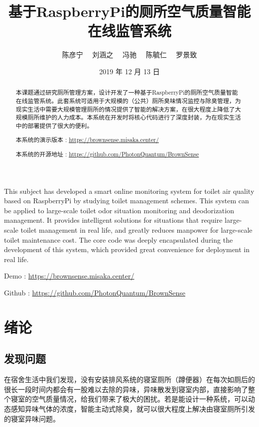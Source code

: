 \documentclass[degree=course]{sjtuthesis}
\title{基于RaspberryPi的厕所空气质量智能在线监管系统}
\author{
陈彦宁
\ \ 刘涵之
\ \ 冯驰
\ \ 陈毓仁
\ \ 罗景致
}
\date{2019 年 12 月 13 日}
\begin{document}
\maketitle
\frontmatter
\begin{abstract}
本课题通过研究厕所管理方案，设计开发了一种基于RaspberryPi的厕所空气质量智能在线监管系统。此套系统可适用于大规模的（公共）厕所臭味情况监控与除臭管理，为现实生活中需要大规模管理厕所的情况提供了智能的解决方案，在很大程度上降低了大规模厕所维护的人力成本。本系统在开发时将核心代码进行了深度封装，为在现实生活中的部署提供了很大的便利。

\centering
本系统的演示版本 : \url{https://brownsense.misaka.center/}

本系统的开源地址 : \url{https://github.com/PhotonQuantum/BrownSense}

	\centering
\end{abstract}

\begin{enabstract}
This subject has developed a smart online monitoring system for toilet air quality based on RaspberryPi by studying toilet management schemes. This system can be applied to large-scale toilet odor situation monitoring and deodorization management. It provides intelligent solutions for situations that require large-scale toilet management in real life, and greatly reduces manpower for large-scale toilet maintenance cost. The core code was deeply encapsulated during the development of this system, which provided great convenience for deployment in real life.

\centering
Demo : \url{https://brownsense.misaka.center/}

Github : \url{https://github.com/PhotonQuantum/BrownSense}

    \centering
  \end{enabstract}
\tableofcontents
\listoffigures
\listoftables

\mainmatter
\chapter{绪论}
\section{发现问题}
在宿舍生活中我们发现，没有安装排风系统的寝室厕所（蹲便器）在每次如厕后的很长一段时间内都会有一股难以去除的异味，异味散发到寝室内部，直接影响了整个寝室的空气质量情况，给我们带来了极大的困扰。若是能设计一种系统，可以动态感知异味气体的浓度，智能主动式除臭，就可以很大程度上解决由寝室厕所引发的寝室异味问题。
\end{document}
